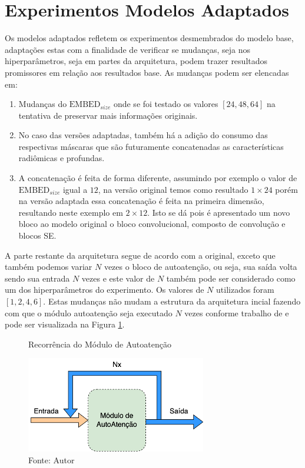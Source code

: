 \section{Experimentos Modelos Adaptados}
\label{sec:cap5_experimentos_adaptados}

Os modelos adaptados refletem os experimentos desmembrados do modelo base, adaptações estas com a finalidade de verificar se mudanças, seja nos hiperparâmetros, seja em partes da arquitetura, podem trazer resultados promissores em relação aos resultados base. As mudanças podem ser elencadas em: 

\begin{enumerate}

\item Mudanças do $\text{EMBED}_{size}$ onde se foi testado os valores $[24, 48, 64]$ na tentativa de preservar mais informações originais.

\item No caso das versões adaptadas, também há a adição do consumo das respectivas máscaras que são futuramente concatenadas as características radiômicas e profundas.

\item A concatenação é feita de forma diferente, assumindo por exemplo o valor de $\text{EMBED}_{size}$ igual a $12$, na versão original temos como resultado $1\times24$ porém na versão adaptada essa concatenação é feita na primeira dimensão, resultando neste exemplo em $2\times12$. Isto se dá pois é apresentado um novo bloco ao modelo original o bloco convolucional, composto de convolução e blocos \gls{SE}.

\end{enumerate}


A parte restante da arquitetura segue de acordo com a original, exceto que também podemos variar $N$ vezes o bloco de autoatenção, ou seja, sua saída volta sendo sua entrada $N$ vezes e este valor de $N$ também pode ser considerado como um dos hiperparâmetros do experimento. Os valores de $N$ utilizados foram $[1, 2, 4, 6]$. Estas mudanças não mudam a estrutura da arquitetura incial fazendo com que o módulo autoatenção seja executado $N$ vezes conforme trabalho de \cite{vaswaniAttentionAllYou2023} e pode ser visualizada na Figura \ref{fig:fig030}.

\begin{figure}[H]
    \centering
    \caption{Recorrência do Módulo de Autoatenção}
    \includegraphics[width=0.7\textwidth]{figures/fig030.png}
    \caption*{Fonte: Autor}
    \label{fig:fig030}
\end{figure}


